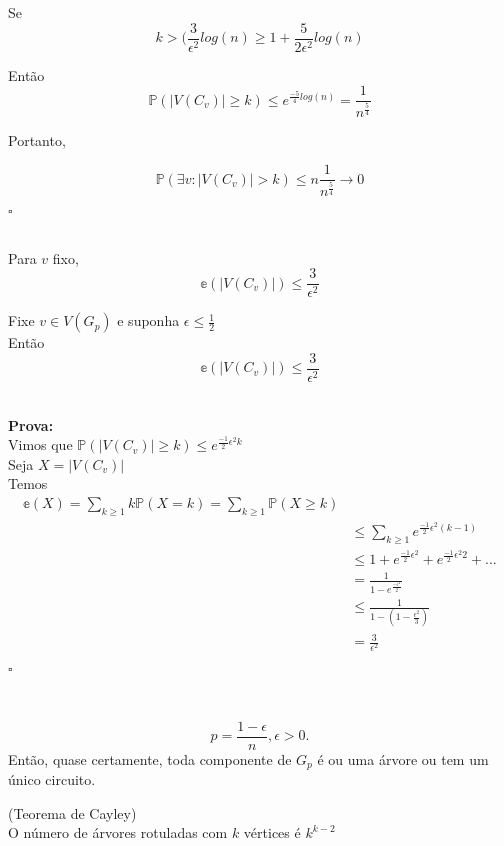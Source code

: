 Se \[k > (\frac{3}{\epsilon^{2}}log(n) \geq 1 + \frac{5}{2\epsilon^{2}} log(n) \] 
 
Então \[\mathbb{P}(|V(C_{v})| \geq k) \leq e^{\frac{-5}{4}log(n)} = \frac{1}{n^{\frac{5}{4}}}\]

Portanto,

\[\mathbb{P}(\exists v: |V(C_{v})|>k) \leq n \frac{1}{n^{\frac{5}{4}}} \rightarrow 0 \]

\begin{flushright}
$\square$
\end{flushright}\\

Para $v$ fixo, \[\mathbb{e}(|V(C_{v})|) \leq \frac{3}{\epsilon^{2}} \]

\begin{teorema}
Fixe $v\in V(G_{p})$ e suponha $\epsilon \leq \frac{1}{2}$ \\
Então
\[\mathbb{e}(|V(C_{v})|) \leq \frac{3}{\epsilon^{2}} \]
\end{teorema}\\
\textbf{Prova:} \\
Vimos que $\mathbb{P}(|V(C_{v})|\geq k) \leq e^{\frac{-1}{2}\epsilon^{2}k}$
\\
Seja $X = |V(C_{v})|$
\\
Temos
\begin{align*}
	\mathbb{e}(X) = \sum_{k \geq 1} k\mathbb{P}(X=k) = \sum_{k \geq 1} \mathbb{P}(X \geq k) \\
	&\leq \sum_{k \geq 1} e^{\frac{-1}{2}\epsilon^2(k-1)} \\
	&\leq  1 + e^{\frac{-1}{2}\epsilon^2} + e^{\frac{-1}{2}\epsilon^2 2} + ... \\
	&= \frac{1}{1-e^{\frac{-\epsilon^{2}}{2}}} \\
	&\leq \frac{1}{1-(1-\frac{\epsilon^{2}}{3})} \\
	& = \frac{3}{\epsilon^2}
\end{align*}

\begin{flushright}
$\square$
\end{flushright}\\

\begin{teorema}
\[p = \frac{1-\epsilon}{n}, \epsilon > 0.\] Então, quase certamente, toda componente de $G_{p}$ é ou uma árvore ou tem um único circuito.
\end{teorema}

\begin{lema}
(Teorema de Cayley)\\
O número de árvores rotuladas com $k$ vértices é $k^{k-2}$
\end{lema}\\

